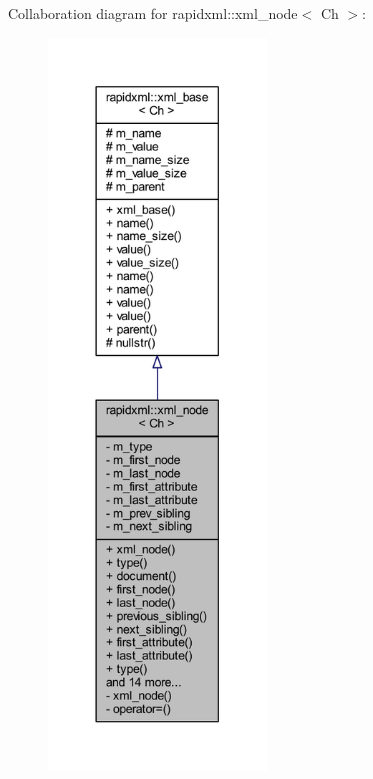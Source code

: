 Collaboration diagram for rapidxml\+:\+:xml\+\_\+node$<$ Ch $>$\+:
\nopagebreak
\begin{figure}[H]
\begin{center}
\leavevmode
\includegraphics[height=550pt]{singletonrapidxml_1_1xml__node__coll__graph}
\end{center}
\end{figure}
